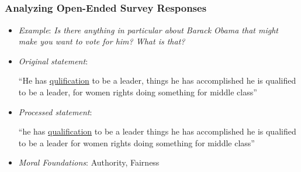 \documentclass{beamer}
\begin{document}
\subsection{}
\begin{frame}%
  \frametitle{Analyzing Open-Ended Survey Responses}
  \begin{itemize}
    \item \emph{Example}: \textit{Is there anything in particular about Barack Obama that might make you want to vote for him? What is that?}
    \item \emph{\textit{Original statement}}:
    \begin{center}
      ``He has \underline{qulification} to be a leader, things he has accomplished he is qualified to be a leader, for women rights doing something for middle class''
    \end{center}
    \item \emph{\textit{Processed statement}}:
    \begin{center}
      ``he has \underline{qualification} to be a {\color{red}leader} things he has accomplished he is qualified to be a {\color{red}leader} for women {\color{green}rights} doing something for middle {\color{red}class}''
    \end{center}
  \item \emph{\textit{Moral Foundations}}: {\color{red}Authority}, {\color{green}Fairness}
  \end{itemize}
\end{frame}
\end{document}

